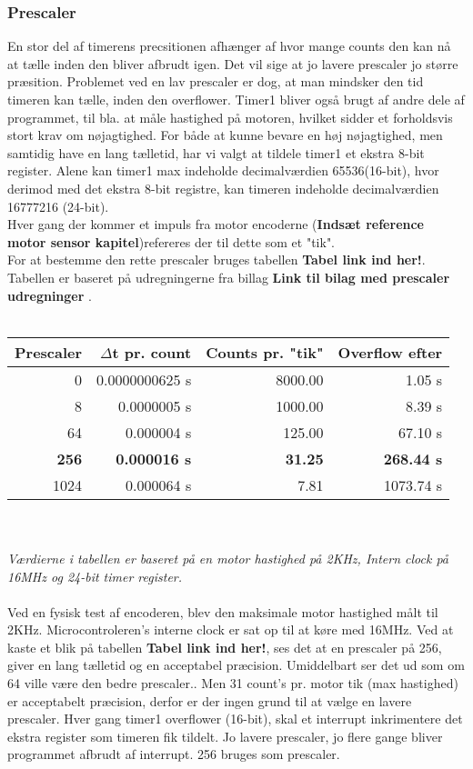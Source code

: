 \subsubsection{Prescaler}
En stor del af timerens precsitionen afhænger af hvor mange counts den kan nå at tælle inden den bliver afbrudt igen. Det vil sige at jo lavere prescaler jo større præsition. Problemet ved en lav prescaler er dog, at man mindsker den tid timeren kan tælle, inden den overflower. Timer1 bliver også brugt af andre dele af programmet, til bla. at måle hastighed på motoren, hvilket sidder et forholdsvis stort krav om nøjagtighed. For både at kunne bevare en høj nøjagtighed, men samtidig have en lang tælletid, har vi valgt at tildele timer1 et ekstra 8-bit register. Alene kan timer1 max indeholde decimalværdien 65536(16-bit), hvor derimod med det ekstra 8-bit registre, kan timeren indeholde decimalværdien 16777216 (24-bit).\\
Hver gang der kommer et impuls fra motor encoderne (\textbf{Indsæt reference motor sensor kapitel})refereres der til dette som et "tik".\\
For at bestemme den rette prescaler bruges tabellen \textbf{Tabel link ind her!}. Tabellen er baseret på udregningerne fra billag \textbf{Link til bilag med prescaler udregninger} .\\
\\
\begin{tabular}{ | r | r | r | r | }
	\hline
	Prescaler 		& $\Delta$t pr. count 	& Counts pr. "tik"	&	Overflow efter		\\
	\hline
	0 				& 	 	0.0000000625 s	&  		8000.00		&		1.05 s			\\
	\hline	
	8 				& 	 	0.0000005 s		&  		1000.00		&		8.39 s			\\
	\hline
	64 				& 	 	0.000004 s		&  		125.00		&		67.10 s			\\
	\hline
	\textbf{256} 	& \textbf{0.000016 s}	&  	\textbf{31.25}	&	\textbf{268.44 s}	\\
	\hline
	1024 			& 	 	0.000064 s		&  		7.81		&		1073.74 s		\\
	\hline
\end{tabular}\\\\
\textsl{\footnotesize *Værdierne i tabellen er baseret på en motor hastighed på 2KHz, Intern clock på 16MHz og 24-bit timer register.}\\
\\
Ved en fysisk test af encoderen, blev den maksimale motor hastighed målt til 2KHz.
Microcontroleren's interne clock er sat op til at køre med 16MHz. Ved at kaste et blik på tabellen \textbf{Tabel link ind her!}, ses det at en prescaler på 256, giver en lang tælletid og en acceptabel præcision. Umiddelbart ser det ud som om 64 ville være den bedre prescaler.. 
Men 31 count's pr. motor tik (max hastighed) er acceptabelt præcision, derfor er der ingen grund til at vælge en lavere prescaler. Hver gang timer1 overflower (16-bit), skal et interrupt inkrimentere det ekstra register som timeren fik tildelt. Jo lavere prescaler, jo flere gange bliver programmet afbrudt af interrupt. 256 bruges som prescaler.




